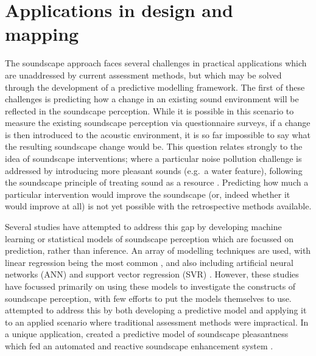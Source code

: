 \documentclass[
  authoryear,
  preprint,
  1p]{elsarticle}
\begin{document}
\hypertarget{applications-in-design-and-mapping}{%
\section{Applications in design and
mapping}\label{applications-in-design-and-mapping}}

The soundscape approach faces several challenges in practical
applications which are unaddressed by current assessment methods, but
which may be solved through the development of a predictive modelling
framework. The first of these challenges is predicting how a change in
an existing sound environment will be reflected in the soundscape
perception. While it is possible in this scenario to measure the
existing soundscape perception via questionnaire surveys, if a change is
then introduced to the acoustic environment, it is so far impossible to
say what the resulting soundscape change would be. This question relates
strongly to the idea of soundscape interventions; where a particular
noise pollution challenge is addressed by introducing more pleasant
sounds (e.g.~a water feature), following the soundscape principle of
treating sound as a resource
\citep{Lavia2016Soundscape, Moshona2022What}. Predicting how much a
particular intervention would improve the soundscape (or, indeed whether
it would improve at all) is not yet possible with the retrospective
methods available.

Several studies have attempted to address this gap by developing machine
learning or statistical models of soundscape perception which are
focussed on prediction, rather than inference. An array of modelling
techniques are used, with linear regression being the most common
\citep{Lionello2020systematic}, and also including artificial neural
networks (ANN) \citep{PuyanaRomero2016Modelling, Yu2009Modeling} and
support vector regression (SVR)
\citep{Fan2016Automatic, Fan2017Emo, Giannakopoulos2019Athens}. However,
these studies have focussed primarily on using these models to
investigate the constructs of soundscape perception, with few efforts to
put the models themselves to use. \citet{Mitchell2021Investigating}
attempted to address this by both developing a predictive model and
applying it to an applied scenario where traditional assessment methods
were impractical. In a unique application, \citet{Ooi2022Probably}
created a predictive model of soundscape pleasantness which fed an
automated and reactive soundscape enhancement system
\citep{Watcharasupat2022Autonomous}.
\end{document}
